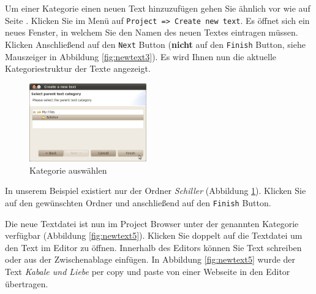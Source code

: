 Um einer Kategorie einen neuen Text hinzuzufügen gehen Sie ähnlich vor wie auf Seite \pageref{sec:newtext}. %
Klicken Sie im Menü auf \texttt{Project => Create new text}. Es öffnet sich ein neues Fenster, in welchem Sie den Namen des neuen Textes eintragen müssen. %
Klicken Anschließend auf den \texttt{Next} Button (\textbf{nicht} auf den \texttt{Finish} Button, siehe Mauszeiger in Abbildung \ref{fig:newtext3}). Es wird Ihnen nun %
die aktuelle Kategoriestruktur der Texte angezeigt. 
%
\begin{figure}
 \vspace{-15pt}
 \begin{center}
    \includegraphics[width=0.45\textwidth]{img/createnewtext4}
	\caption{Kategorie auswählen}
	\label{fig:newtext4}
  \end{center}
  \vspace{12pt}
\end{figure}
% 
% 

In unserem Beispiel existiert nur der Ordner \textit{Schiller} (Abbildung \ref{fig:newtext4}). %
Klicken Sie auf den gewünschten Ordner und anschließend auf den \texttt{Finish} Button. 


Die neue Textdatei ist nun im Project Browser unter der genannten Kategorie verfügbar (Abbildung \ref{fig:newtext5}). %
Klicken Sie doppelt auf die Textdatei um den Text im Editor zu öffnen. Innerhalb des Editors können Sie Text %
schreiben oder aus der Zwischenablage einfügen. In Abbildung \ref{fig:newtext5} wurde der Text \textit{Kabale und Liebe} per copy und paste von einer Webseite in den %
Editor übertragen.

